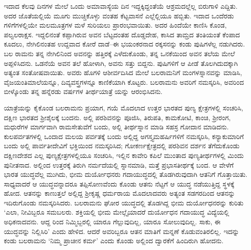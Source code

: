 ಇದಾದ ಕೆಲವು ದಿನಗಳ ಮೇಲೆ ಒಂದು ಅಮಾವಾಸ್ಯೆಯ ದಿನ ಇದ್ದಕ್ಕಿದ್ದಂತೆಯೆ ಆಶ್ರಮದಲ್ಲೆಲ್ಲ ಬಿರುಗಾಳಿ ಎದ್ದಿತು. ಅದರ ಜೊತೆಯಲ್ಲಿಯೆ ಮೂಗು ಮುಚ್ಚಿಕೊಳ್ಳು ವಂತಹ ಕೆಟ್ಟವಾಸನೆ ಎಲ್ಲೆಲ್ಲಿಯೂ ಹಬ್ಬಿತು. ಇದಾದ ಒಂದೆರಡು ಗಳಿಗೆಗಳಲ್ಲಿಯೇ ಮಲಮೂತ್ರಗಳ ಮಳೆ ಸುರಿಯಲು ಪ್ರಾರಂಭವಾಯಿತು. ಅದರ ಹಿಂದೆಯೇ ಕಾಣಿಸಿ ಕೊಂಡ, ಪಲ್ವಲರಾಕ್ಷಸ. ಇದ್ದಲಿನಂತೆ ಕಪ್ಪಾಗಿರುವ ಅವನ ಬೆಟ್ಟದಂತಹ ದೊಡ್ಡದೇಹ, ಕಾಸಿದ ತಾಮ್ರದ ತಂತಿಯಂತೆ ಕೆಂಪಾದ ಕೂದಲು, ನೇಗಿಲಿನಂತಹ ಉದ್ದವಾದ ಕೋರೆ ದಾಡೆ–ಈ ಭಯಂಕರನಾದ ರಕ್ಕಸನನ್ನು ಕಂಡು ಪುಷಿಗಳೆಲ್ಲ ನಡುಗಿದರು. ಬಲ ರಾಮನು ತನ್ನ ನೇಗಿಲಿನಿಂದ ಅವನನ್ನು ಹತ್ತಿರಕ್ಕೆ ಎಳೆದುಕೊಂಡು, ತನ್ನ ಒನಕೆಯಿಂದ ಅವನ ತಲೆಯ ಮೇಲೆ ಅಪ್ಪಳಿಸಿದನು. ಒಡನೆಯೆ ಅವನ ತಲೆ ಹೋಳಾಗಿ, ಅವನು ಸತ್ತು ಬಿದ್ದನು. ಪುಷಿಗಳಿಗೆ ಆ ಪೀಡೆ ತೊಲಗಿದುದಕ್ಕಾಗಿ ಅತ್ಯಂತ ಸಂತೋಷವಾಯಿತು. ಅವರು ಹೊಗಳಿ ಆಶೀರ್ವದಿಸಿದ ಮೇಲೆ ಬಲರಾಮನಿಗೆ ಮಂಗಳಸ್ನಾನವನ್ನು ಮಾಡಿಸಿ, ವೈಜಯಂತಿಮಾಲೆಯನ್ನೂ, ದಿವ್ಯವಸ್ತ್ರಗಳನ್ನೂ ಕಾಣಿಕೆಯಾಗಿ ಕೊಟ್ಟರು. ಬಲರಾಮನು ಅವರಿಗೆ ನಮಸ್ಕರಿಸಿ, ಅವರಿಂದ ಬೀಳ್ಕೊಂಡು ತನ್ನ ಹನ್ನೆರಡು ವರ್ಷಗಳ ತೀರ್ಥಯಾತ್ರೆ ಯನ್ನು ಆರಂಭಿಸಿದನು.

ಯಾತ್ರೆಯನ್ನು ಕೈಕೊಂಡ ಬಲರಾಮನು ಪ್ರಯಾಗ, ಗಯೆ ಮೊದಲಾದ ಉತ್ತರ ಭಾರತದ ಪುಣ್ಯ ಕ್ಷೇತ್ರಗಳಲ್ಲಿ ಸಂಚರಿಸಿ, ದಕ್ಷಿಣ ಭಾರತದ ಶ್ರೀಶೈಲಕ್ಕೆ ಬಂದನು. ಅಲ್ಲಿ ಪರಶಿವನನ್ನು ಪೂಜಿಸಿ, ತಿರುಪತಿ, ಕಾಮಕೋಟಿ, ಕಾಂಚಿ, ಶ್ರೀರಂಗ, ಮಧುರೆಗಳ ಮಾರ್ಗವಾಗಿ ರಾಮಸೇತುವೆಗೆ ಬಂದು, ಅಲ್ಲಿ ತೀರ್ಥಸ್ನಾನ ಮಾಡಿ ಸಹಸ್ರ ಗೋದಾನ ಮಾಡಿದನು. ಕುಲಪರ್ವತಗಳಲ್ಲಿ ಒಂದಾದ ಮಲಯ ಪರ್ವತಕ್ಕೆ ಬಂದು ಅಲ್ಲಿದ್ದ ಅಗಸ್ತ್ಯಮಹರ್ಷಿಗಳಿಗೆ ನಮಸ್ಕರಿಸಿ, ಕನ್ಯಾಕುಮಾರಿಗೆ ಬಂದು ಅಲ್ಲಿ ಪಾರ್ವತೀದೇವಿಗೆ ಭಕ್ತಿಯಿಂದ ನಮಸ್ಕರಿಸಿದ; ಗೋಕರ್ಣಕ್ಷೇತ್ರದಲ್ಲಿ ಪರಶಿವನ ದರ್ಶನ ತೆಗೆದುಕೊಂಡು ದಕ್ಷಿಣದೇಶದ ಎಲ್ಲ ಪುಣ್ಯಕ್ಷೇತ್ರಗಳಲ್ಲಿಯೂ ಸಂಚರಿಸಿ, ಇಲ್ಲಿನ ಕಾವೇರಿ ಕಪಿಲೆ ಮುಂತಾದ ಪುಣ್ಯತೀರ್ಥಗಳಲ್ಲಿ ಮಿಂದು ಪುನೀತನಾದ. ಅಲ್ಲಿಂದ ಉತ್ತರಕ್ಕೆ ತಿರುಗಿ ನರ್ಮದೆಯಲ್ಲಿ ಸ್ನಾನಮಾಡಿ, ಮತ್ತೆ ಪ್ರಭಾಸತೀರ್ಥಕ್ಕೆ ಬಂದ. ಆ ವೇಳೆಗೆ ಭಾರತ ಯುದ್ಧವೆಲ್ಲ ಮುಗಿದು, ಭೀಮ ದುರ್ಯೋಧನರು ಗದಾಯುದ್ಧದಲ್ಲಿ ತೊಡಗಿರುವುದಾಗಿ ಆತನಿಗೆ ಗೊತ್ತಾಯಿತು. ಸಾಧ್ಯವಾದರೆ ಆ ಯುದ್ಧವನ್ನಾದರೂ ತಪ್ಪಿಸೋಣವೆಂದು ಕೊಂಡು ಆತನು ನೆಟ್ಟಗೆ ಆ ಯುದ್ಧ ನಡೆಯುತ್ತಿದ್ದ ಸ್ಥಳಕ್ಕೆ ಹೋದ. ಆತನನ್ನು ಕಾಣುತ್ತಲೆ ಅಲ್ಲಿದ್ದ ಶ್ರೀಕೃಷ್ಣ ಧರ್ಮರಾಯ ಮೊದಲಾದವರು ಅತ್ಯಂತ ಸಡಗರದಿಂದ ಆತನನ್ನು ಇದಿರುಗೊಂಡು ನಮಸ್ಕರಿಸಿದರು. ಬಲರಾಮನು ಘೋರ ಯುದ್ಧದಲ್ಲಿ ತೊಡಗಿದ್ದ ಭೀಮ ದುರ್ಯೋಧನರನ್ನು ಕುರಿತು ‘ಎಲಾ, ನೀವಿಬ್ಬರೂ ಸಮಬಲರು. ಶಕ್ತಿಯಲ್ಲಿ ಭೀಮ ಮೇಲ್ಗೈಯಾದರೆ ದುರ್ಯೋಧನ ಗದಾಯುದ್ಧ ವಿದ್ಯೆಯಲ್ಲಿ ಅಧಿಕನಾದವನು. ಆದ್ದ ರಿಂದ ನಿಮ್ಮಿಬ್ಬರಲ್ಲಿ ಯಾರೂ ಗೆಲ್ಲುವುದಿಲ್ಲ, ಯಾರೂ ಸೋಲುವುದಿಲ್ಲ. ಸಾಕು, ಈ ಯುದ್ಧವನ್ನು ನಿಲ್ಲಿಸಿರಿ’ ಎಂದು ಹೇಳಿದ. ಆದರೆ ಅವರಿಬ್ಬರೂ ಆತನ ಮಾತಿಗೆ ಮನ್ನಣೆ ಕೊಡುವಂತಿರಲಿಲ್ಲ. ಇದನ್ನು ಕಂಡು ಬಲರಾಮನು ‘ನಿಮ್ಮ ಪ್ರಾಚೀನ ಕರ್ಮ’ ಎಂದು ಕೊಂಡು ಅಲ್ಲಿಂದ ದ್ವಾರಕೆಗೆ ಹಿಂದಿರುಗಿ ಹೋದನು.

